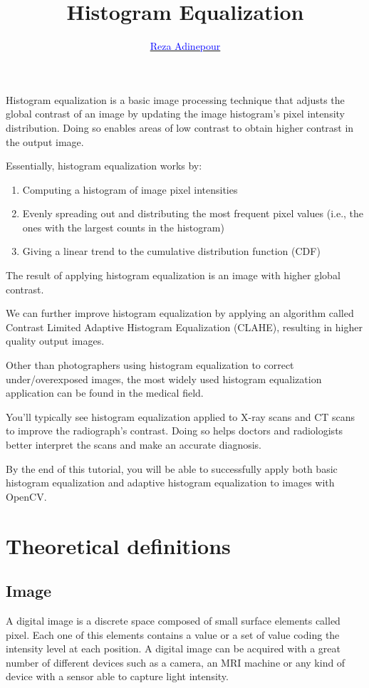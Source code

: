 \documentclass[12pt]{article}
\title{\textbf{Histogram Equalization}}
\author{\href{https://github.com/rezaAdinepour/Histogram-Equalization.git}{\textcolor{blue}{Reza Adinepour}}}
\begin{document}
	
\maketitle
Histogram equalization is a basic image processing technique that adjusts the global contrast of an image by updating the image histogram’s pixel intensity distribution. Doing so enables areas of low contrast to obtain higher contrast in the output image.

Essentially, histogram equalization works by:
\begin{enumerate}
	\item Computing a histogram of image pixel intensities
	\item  Evenly spreading out and distributing the most frequent pixel values (i.e., the ones with the largest counts in the histogram)
	\item Giving a linear trend to the cumulative distribution function (CDF)
\end{enumerate}

The result of applying histogram equalization is an image with higher global contrast.

We can further improve histogram equalization by applying an algorithm called Contrast Limited Adaptive Histogram Equalization (CLAHE), resulting in higher quality output images.

Other than photographers using histogram equalization to correct under/overexposed images, the most widely used histogram equalization application can be found in the medical field.

You’ll typically see histogram equalization applied to X-ray scans and CT scans to improve the radiograph’s contrast. Doing so helps doctors and radiologists better interpret the scans and make an accurate diagnosis.

By the end of this tutorial, you will be able to successfully apply both basic histogram equalization and adaptive histogram equalization to images with OpenCV.


\section{Theoretical definitions}
	\subsection{Image}
	A digital image is a discrete space composed of small surface elements called pixel. Each one of this elements contains a value or a set of value coding the intensity level at each position. A digital image can be acquired with a great number of different devices such as a camera, an MRI machine or any kind of device with a sensor able to capture light intensity.
	
\end{document}
